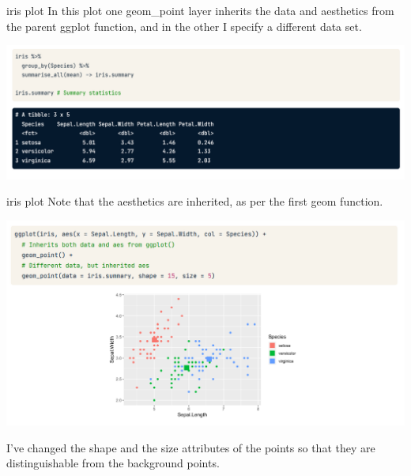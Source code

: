 \documentclass[
  ignorenonframetext,
]{beamer}
\begin{document}
\begin{frame}{iris plot}
\label{iris-plot}
In this plot one geom\_point layer inherits the data and aesthetics from
the parent ggplot function, and in the other I specify a different data
set.

\includegraphics{../images/im189.png}
\end{frame}

\begin{frame}{iris plot}
\label{iris-plot-1}
Note that the aesthetics are inherited, as per the first geom function.

\includegraphics{../images/im190.png}

I've changed the shape and the size attributes of the points so that
they are distinguishable from the background points.
\end{frame}
\end{document}
